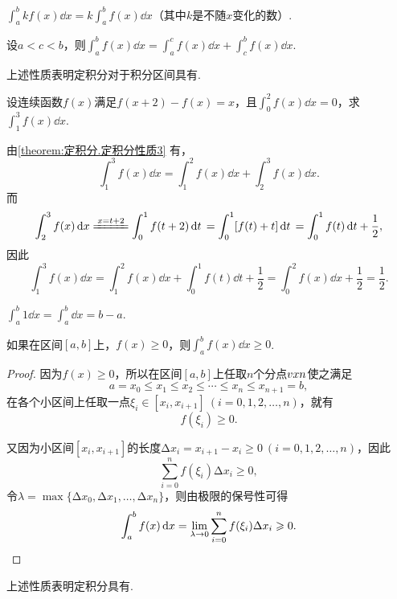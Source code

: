 \begin{property}\label{theorem:定积分.定积分性质2}
\(\int_a^b{kf(x)\dd{x}}=k\int_a^b f(x) \dd{x}\)（其中\(k\)是不随\(x\)变化的数）.
\end{property}

\begin{property}\label{theorem:定积分.定积分性质3}
设\(a < c < b\)，则\(\int_a^b f(x) \dd{x}
= \int_a^c{f(x)\dd{x}} + \int_c^b{f(x)\dd{x}}\).
\end{property}
上述性质表明定积分对于积分区间具有.

\begin{example}
设连续函数\(f(x)\)满足\(f(x+2)-f(x)=x\)，且\(\int_0^2 f(x) \dd{x} = 0\)，求\(\int_1^3 f(x) \dd{x}\).
\begin{solution}
由\cref{theorem:定积分.定积分性质3} 有，\[
\int_1^3 f(x) \dd{x}
= \int_1^2 f(x) \dd{x}
+ \int_2^3 f(x) \dd{x}.
\]而\[
\int_2^3 f(x) \dd{x}
\xlongequal{x=t+2} \int_0^1 f(t+2) \dd{t} \\
= \int_0^1 [f(t) + t] \dd{t} \\
= \int_0^1 f(t) \dd{t} + \frac{1}{2},
\]因此\[
\int_1^3 f(x) \dd{x}
= \int_1^2 f(x) \dd{x}
+ \int_0^1 f(t) \dd{t} + \frac{1}{2}
= \int_0^2 f(x) \dd{x} + \frac{1}{2}
= \frac{1}{2}.
\]
\end{solution}
\end{example}

\begin{property}\label{theorem:定积分.定积分性质4}
\(\int_a^b 1 \dd{x} = \int_a^b \dd{x} = b-a\).
\end{property}

\begin{property}\label{theorem:定积分.定积分性质5}
如果在区间\([a,b]\)上，\(f(x) \geqslant 0\)，则\(\int_a^b f(x) \dd{x} \geqslant 0\).
\begin{proof}
因为\(f(x) \geqslant 0\)，所以在区间\([a,b]\)上任取\(n\)个分点\(v{x}{n}\)使之满足\[
a = x_0 \leqslant x_1 \leqslant x_2 \leqslant \dotsb \leqslant x_n \leqslant x_{n+1} = b,
\]在各个小区间上任取一点\(\xi_i\in[x_i,x_{i+1}]\ (i=0,1,2,\dotsc,n)\)，就有\[
f(\xi_i)\geqslant0.
\]

又因为小区间\([x_i,x_{i+1}]\)的长度\(\increment x_i = x_{i+1}-x_i \geqslant 0\ (i=0,1,2,\dotsc,n)\)，因此\[
\sum\limits_{i=0}^n f(\xi_i) \increment x_i \geqslant 0,
\]令\(\lambda = \max\{\increment x_0, \increment x_1, \dotsc, \increment x_n\}\)，则由极限的保号性可得\[
\int_a^b f(x) \dd{x} = \lim\limits_{\lambda\to0} \sum\limits_{i=0}^n f(\xi_i) \Delta x_i \geqslant 0.
\qedhere
\]
\end{proof}
\end{property}
上述性质表明定积分具有.

